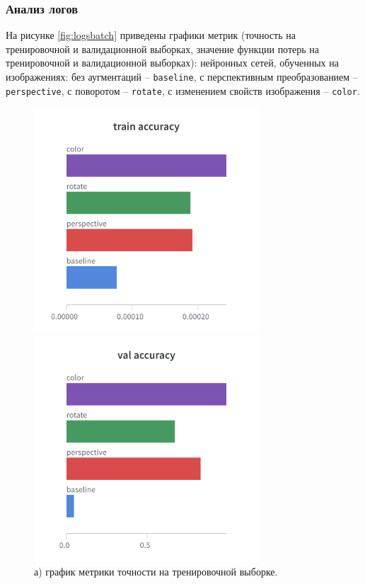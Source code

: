 \documentclass[14pt, russian]{scrartcl}
\begin{document}
\subsubsection{Анализ логов}
На рисунке \ref{fig:logsbatch} приведены графики метрик (точность на тренировочной и валидационной выборках, значение функции потерь на тренировочной и валидационной выборках): нейронных сетей, обученных на изображениях: без аугментаций -- \verb|baseline|, с перспективным преобразованием -- \verb|perspective|, с поворотом -- \verb|rotate|, с изменением свойств изображения -- \verb|color|.

\begin{figure}[H]
	\centering
	\begin{minipage}[t]{.4\textwidth}
		\centering
		\includegraphics[width=0.75\textwidth]{./img/train_accuracy.png}
		\caption*{а) график метрики точности на тренировочной выборке.}
	\end{minipage}
        \begin{minipage}[t]{.4\linewidth}
		\centering
		\includegraphics[width=0.75\textwidth]{./img/val_accuracy.png}

\end{minipage}
\end{figure}
\end{document}
